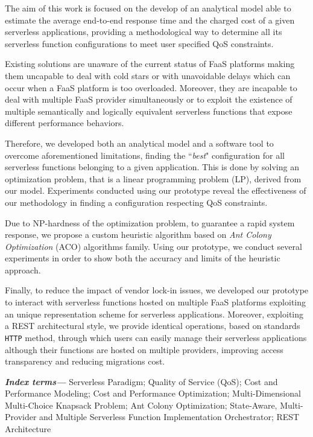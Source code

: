\documentclass[12pt,a4paper]{report}
\providecommand{\keywords}[1]{\textbf{\textit{Index terms---}} #1}
\newcommand{\ItalicQuotMark}[1]{``\textit{#1}"}
\begin{document}
The aim of this work is focused on the develop of an analytical model able to estimate the average end-to-end response time and the charged cost of a given serverless applications, providing a methodological way to determine all its serverless function configurations to meet user specified QoS constraints.

Existing solutions are unaware of the current status of FaaS platforms making them uncapable to deal with cold stars or with unavoidable delays which can occur when a FaaS platform is too overloaded. Moreover, they are incapable to deal with multiple FaaS provider simultaneously or to exploit the existence of multiple semantically and logically equivalent serverless functions that expose different performance behaviors.

Therefore, we developed both an analytical model and a software tool to overcome aforementioned limitations, finding the \ItalicQuotMark{best} configuration for all serverless functions belonging to a given application. This is done by solving an optimization problem, that is a linear programming problem (LP), derived from our model. Experiments conducted using our prototype reveal the effectiveness of our methodology in finding a configuration respecting QoS constraints.

Due to NP-hardness of the optimization problem, to guarantee a rapid system response, we propose a custom heuristic algorithm based on \textit{Ant Colony Optimization} (ACO) algorithms family. Using our prototype, we conduct several experiments in order to show both the accuracy and limits of the heuristic approach.

Finally, to reduce the impact of vendor lock-in issues, we developed our prototype to interact  with serverless functions hosted on multiple FaaS platforms exploiting an unique representation scheme for serverless applications. Moreover, exploiting a REST architectural style, we provide identical operations, based on standards \texttt{HTTP} method, through which users can easily manage their serverless applications although their functions are hosted on multiple providers, improving access transparency and reducing migrations cost.

\vfill
\keywords{Serverless Paradigm; Quality of Service (QoS); Cost and Performance Modeling; Cost and Performance Optimization; Multi-Dimensional Multi-Choice Knapsack Problem; Ant Colony Optimization; State-Aware, Multi-Provider and Multiple Serverless Function Implementation Orchestrator; REST Architecture}
\end{document}
